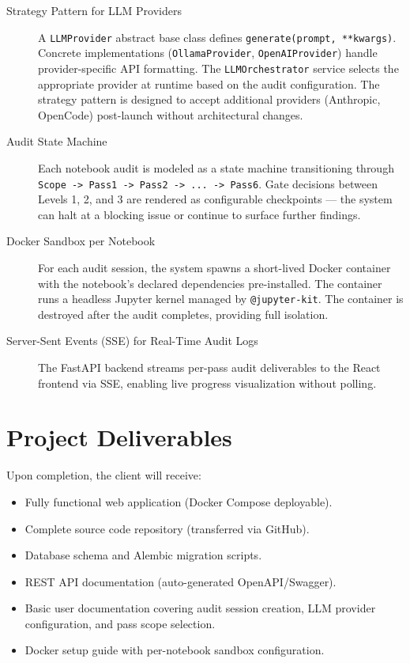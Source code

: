 \documentclass[11pt, a4paper]{article}
\begin{document}
\begin{description}
  \item[Strategy Pattern for LLM Providers] A \texttt{LLMProvider} abstract base
    class defines \texttt{generate(prompt, **kwargs)}. Concrete implementations
    (\texttt{OllamaProvider}, \texttt{OpenAIProvider})
    handle provider-specific API formatting. The
    \texttt{LLMOrchestrator} service selects the appropriate provider at runtime
    based on the audit configuration. The strategy pattern is designed to accept
    additional providers (Anthropic, OpenCode) post-launch without architectural
    changes.

  \item[Audit State Machine] Each notebook audit is modeled as a state machine
    transitioning through \texttt{Scope -> Pass1 -> Pass2 -> ... -> Pass6}. Gate
    decisions between Levels 1, 2, and 3 are rendered as configurable checkpoints
    --- the system can halt at a blocking issue or continue to surface further
    findings.

  \item[Docker Sandbox per Notebook] For each audit session, the system spawns a
    short-lived Docker container with the notebook's declared dependencies
    pre-installed. The container runs a headless Jupyter kernel managed by
    \texttt{@jupyter-kit}. The container is destroyed after the audit completes,
    providing full isolation.

  \item[Server-Sent Events (SSE) for Real-Time Audit Logs] The FastAPI backend
    streams per-pass audit deliverables to the React frontend via SSE, enabling
    live progress visualization without polling.
\end{description}

\section{Project Deliverables}

Upon completion, the client will receive:

\begin{itemize}
  \item Fully functional web application (Docker Compose deployable).
  \item Complete source code repository (transferred via GitHub).
  \item Database schema and Alembic migration scripts.
  \item REST API documentation (auto-generated OpenAPI/Swagger).
  \item Basic user documentation covering audit session creation, LLM provider
    configuration, and pass scope selection.
  \item Docker setup guide with per-notebook sandbox configuration.
\end{itemize}
\end{document}
